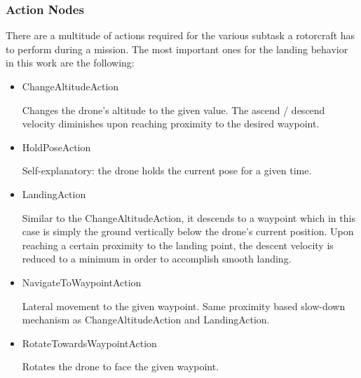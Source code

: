 \subsubsection{Action Nodes}\label{subsubsec:setup:action_nodes}

There are a multitude of actions required for the various subtask a rotorcraft has to perform during a mission. The most important ones for the landing behavior in this work are the following:

\begin{itemize}
    \item ChangeAltitudeAction
    
    Changes the drone's altitude to the given value. The ascend / descend velocity diminishes upon reaching proximity to the desired waypoint.
    \item HoldPoseAction
    
    Self-explanatory: the drone holds the current pose for a given time.
    \item LandingAction
    
    Similar to the ChangeAltitudeAction, it descends to a waypoint which in this case is simply the ground vertically below the drone's current position. Upon reaching a certain proximity to the landing point, the descent velocity is reduced to a minimum in order to accomplish smooth landing.
    \item NavigateToWaypointAction
    
    Lateral movement to the given waypoint. Same proximity based slow-down mechanism as ChangeAltitudeAction and LandingAction.
    \item RotateTowardsWaypointAction
    
    Rotates the drone to face the given waypoint.
\end{itemize}








